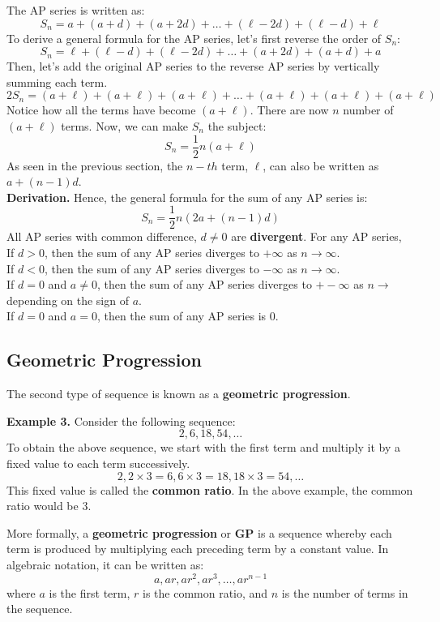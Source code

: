 \documentclass[12pt]{article}
\begin{document}
The AP series is written as:
\[
	S_n = a + (a + d) + (a + 2d) + \dots + (\ell - 2d) + (\ell - d) + \ell
\]
To derive a general formula for the AP series, let's first reverse the order of $S_n$:
\[
	S_n = \ell + (\ell - d) + (\ell - 2d) + \dots + (a + 2d) + (a + d) + a
\]
Then, let's add the original AP series to the reverse AP series by vertically summing each term.
\[
	2S_n = (a + \ell) + (a + \ell) + (a + \ell) + \dots + (a + \ell) + (a + \ell) + (a + \ell)
\]
Notice how all the terms have become $(a + \ell)$. There are now $n$ number of $(a + \ell)$ terms. Now, we can make $S_n$ the subject:
\[
	S_n = \frac{1}{2}n(a + \ell)
\]
As seen in the previous section, the $n-th$ term, $\ell$, can also be written as $a + (n - 1)d$.  \\
\textbf{Derivation.} Hence, the general formula for the sum of any AP series is:
\[
	S_n = \frac{1}{2}n(2a + (n-1)d)
\]
All AP series with common difference, $d \neq 0$ are \textbf{divergent}. For any AP series,  \\
If $d > 0$, then the sum of any AP series diverges to $+\infty$ as $n \rightarrow \infty$.  \\
If $d < 0$, then the sum of any AP series diverges to $-\infty$ as $n \rightarrow \infty$.  \\
If $d = 0$ and $a \neq 0$, then the sum of any AP series diverges to $+-\infty$ as $n \rightarrow$ depending on the sign of $a$. \\
If $d = 0$ and $a = 0$, then the sum of any AP series is $0$.

\subsection{Geometric Progression}

The second type of sequence is known as a \textbf{geometric progression}.

\textbf{Example 3.} Consider the following sequence:
\[
	2, 6, 18, 54, \dots
\]
To obtain the above sequence, we start with the first term and multiply it by a fixed value to each term successively.
\[
	2, 2 \times 3 = 6, 6 \times 3 = 18, 18 \times 3 = 54, \dots
\]
This fixed value is called the \textbf{common ratio}. In the above example, the common ratio would be 3.

More formally, a \textbf{geometric progression} or \textbf{GP} is a sequence whereby each term is produced by multiplying each preceding term by a constant value. In algebraic notation, it can be written as:
\[
	a, ar, ar^2, ar^3, \dots, ar^{n-1}
\]
where $a$ is the first term, $r$ is the common ratio, and $n$ is the number of terms in the sequence.
\end{document}
